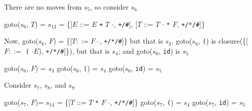 \documentclass[8pt,a4paper,compress]{beamer}
\newcommand{\mm}[1]{$#1$}
\newcommand{\subs}[2]{${#1}_{#2}$}
\newenvironment{spaced}
{
\smallskip
\hspace{.5cm}
\begin{minipage}[c]{\textwidth}
}
{
\end{minipage}
\smallskip
}
\begin{document}
\begin{frame}[fragile]
\pause

There are no moves from $s_5$, so consider $s_6$

\text{ }
\begin{spaced}
\begin{production}
goto(\subs{s}{6}, \mm{T}) = \subs{s}{13}
                = \{[\mm{E}  ::= \mm{E} \lstinline{+} \mm{T} \mm{\cdot}, \lstinline{+/#}],
                     [\mm{T}  ::= \mm{T} \mm{\cdot} \lstinline{*} \mm{F}, \lstinline{+/*/#}]\}
\end{production}
\end{spaced}

\pause

Now, goto($s_6$, $F$) = \{[$T  ::= F \cdot$, \lstinline{+/*/#}]\} but that is $s_3$. goto($s_6$, \lstinline{(}) is closure(\{[$F ::=$ \lstinline{(} $\cdot E$), \lstinline{+/*/#}]\}), but that is $s_4$; and goto($s_6$, \lstinline{id}) is $s_5$

\text{ }
\begin{spaced}
\begin{production}
goto(\subs{s}{6}, \mm{F}) = \subs{s}{3}
goto(\subs{s}{6}, \lstinline{(}) = \subs{s}{4}
goto(\subs{s}{6}, \lstinline{id}) = \subs{s}{5}
\end{production}
\end{spaced}

\pause

Consider $s_7$, $s_8$, and $s_9$

\text{ }
\begin{spaced}
\begin{production}
goto(\subs{s}{7}, \mm{F})= \subs{s}{14}
               = \{[\mm{T}  ::= \mm{T} \lstinline{*} \mm{F} \mm{\cdot}, \lstinline{+/*/#}]\}
goto(\subs{s}{7}, \lstinline{(}) = \subs{s}{4}
goto(\subs{s}{7}, \lstinline{id}) = \subs{s}{5}
\end{production}
\end{spaced}
\end{frame}
\end{document}
